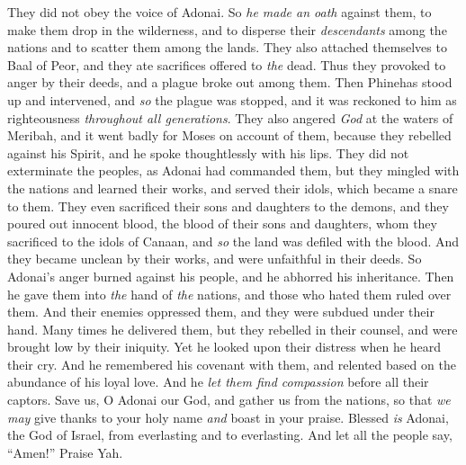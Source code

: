 \begin{biblechapter}
They did not obey the voice of Adonai.
\verse So \textit{he made an oath} against them, 
to make them drop in the wilderness,
\verse and to disperse their \textit{descendants} among the nations 
and to scatter them among the lands.
\verse They also attached themselves to Baal of Peor, 
and they ate sacrifices offered to \textit{the} dead.
\verse Thus they provoked to anger by their deeds, 
and a plague broke out among them.
\verse Then Phinehas stood up and intervened, 
and \textit{so} the plague was stopped,
\verse and it was reckoned to him as righteousness 
\textit{throughout all generations}.
\verse They also angered \textit{God} at the waters of Meribah, 
and it went badly for Moses on account of them,
\verse because they rebelled against his Spirit, 
and he spoke thoughtlessly with his lips.
\verse They did not exterminate the peoples, 
as Adonai had commanded them, 
\verse but they mingled with the nations 
and learned their works,
\verse and served their idols, 
which became a snare to them.
\verse They even sacrificed their sons and daughters 
to the demons,
\verse and they poured out innocent blood, 
the blood of their sons and daughters, 
whom they sacrificed to the idols of Canaan, 
and \textit{so} the land was defiled with the blood.
\verse And they became unclean by their works, 
and were unfaithful in their deeds.
\verse So Adonai’s anger burned against his people, 
and he abhorred his inheritance.
\verse Then he gave them into \textit{the} hand of \textit{the} nations, 
and those who hated them ruled over them.
\verse And their enemies oppressed them, 
and they were subdued under their hand.
\verse Many times he delivered them, 
but they rebelled in their counsel, 
and were brought low by their iniquity.
\verse Yet he looked upon their distress 
when he heard their cry.
\verse And he remembered his covenant with them, 
and relented based on the abundance of his loyal love.
\verse And he \textit{let them find compassion} 
before all their captors.
\verse Save us, O Adonai our God, 
and gather us from the nations, 
so that \textit{we may} give thanks to your holy name 
\textit{and} boast in your praise.
\verse Blessed \textit{is} Adonai, the God of Israel, 
from everlasting and to everlasting. 
And let all the people say, “Amen!” 
Praise Yah.
\end{biblechapter}

